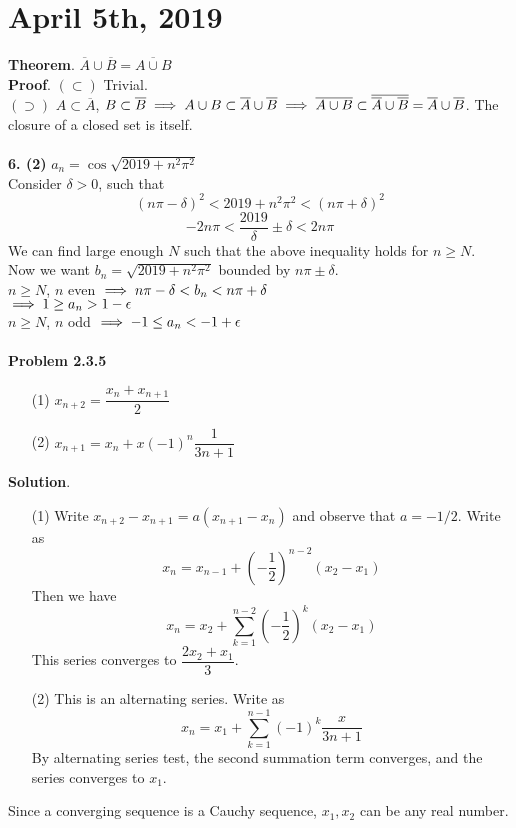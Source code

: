 \section*{April 5th, 2019}
\textbf{Theorem}. $\overline{A}\cup \overline{B} = \overline{A\cup B}$\\
\textbf{Proof}. $(\subset)$ Trivial.\\
$(\supset)$ $A\subset \overline{A}$, $B\subset \overline{B} \implies A\cup B \subset \overline{A}\cup\overline{B} \implies \overline{A\cup B} \subset \overline{\overline{A}\cup \overline{B}} = \overline{A}\cup\overline{B}$. The closure of a closed set is itself.\\
\\
\textbf{6. (2)} $ a_n = \cos\sqrt{2019+n^2\pi^2}$\\
Consider $\delta > 0$, such that $$(n\pi - \delta)^2 < 2019+n^2\pi^2 <(n\pi +\delta)^2$$
$$-2n\pi < \frac{2019}{\delta} \pm \delta < 2n\pi$$
We can find large enough $N$ such that the above inequality holds for $n\geq N$.\\
Now we want $b_n = \sqrt{2019 + n^2\pi^2}$ bounded by $n\pi \pm \delta$.\\
$n\geq N$, $n$ even $\implies n\pi-\delta < b_n < n\pi + \delta$\\
$\implies 1 \geq a_n > 1-\epsilon$\\
$n\geq N$, $n$ odd $\implies -1 \leq a_n < -1+\epsilon$\\
\\
\textbf{Problem 2.3.5} 
\begin{enumerate}
	\item[(1)] $x_{n+2} = \dfrac{x_n+x_{n+1}}{2}$
	\item[(2)] $x_{n+1} = x_n + x(-1)^n \dfrac{1}{3n+1}$
\end{enumerate}
\textbf{Solution}.
\begin{enumerate}
	\item[(1)] Write $x_{n+2} - x_{n+1} = a(x_{n+1} - x_n)$ and observe that $a = -1/2$. Write as $$x_n = x_{n-1} + \left(-\frac{1}{2}\right)^{n-2}(x_2-x_1)$$
	Then we have $$x_n = x_2 + \sum_{k=1}^{n-2} \left(-\frac{1}{2}\right)^{k}(x_2-x_1)$$
	This series converges to $\dfrac{2x_2+x_1}{3}$.
	\item[(2)] This is an alternating series. Write as $$x_n = x_1 + \sum_{k=1}^{n-1}(-1)^k \frac{x}{3n+1}$$
	By alternating series test, the second summation term converges, and the series converges to $x_1$.
\end{enumerate}
Since a converging sequence is a Cauchy sequence, $x_1, x_2$ can be any real number.